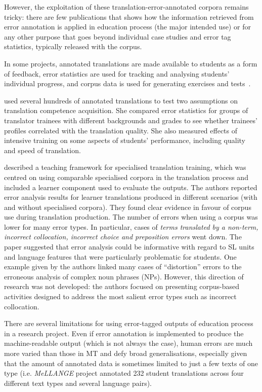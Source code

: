 However, the exploitation of these translation-error-annotated corpora remains tricky: there are few publications that shows how the information retrieved from error annotation is applied in education process (the major intended use) or for any other purpose that goes beyond individual case studies and error tag statistics, typically released with the corpus.

In some projects, annotated translations are made available to students as a form of feedback, error statistics are used for tracking and analysing students’ individual progress, and corpus data is used for generating exercises and tests~\cite{Kutuzov2014rltc,Fictumova2017}.

\citet{Wurm2020} used several hundreds of annotated translations to test two assumptions on translation competence acquisition. She compared error statistics for groups of translator trainees with different backgrounds and grades to see whether trainees' profiles correlated with the translation quality. She also measured effects of intensive training on some aspects of students' performance, including quality and speed of translation.

\citet{Kubler2018} described a teaching framework for specialised translation training, which was centred on using comparable specialised corpora in the translation process and included a learner component used to evaluate the outputs. The authors reported error analysis results for learner translations produced in different scenarios (with and without specialised corpora). They found clear evidence in favour of corpus use during translation production. The number of errors when using a corpus was lower for many error types. In particular, cases of \textit{terms translated by a non-term, incorrect collocation, incorrect choice and preposition errors} went down. The paper suggested that error analysis could be informative with regard to SL units and language features that were particularly problematic for students. One example given by the authors linked many cases of ``distortion'' errors to the erroneous analysis of complex noun phrases (NPs). However, this direction of research was not developed: the authors focused on presenting corpus-based activities designed to address the most salient error types such as incorrect collocation. 

There are several limitations for using error-tagged outputs of education process in a research project.
Even if error annotation is implemented to produce the machine-readable output (which is not always the case), human errors are much more varied than those in MT and defy broad generalisations, especially given that the amount of annotated data is sometimes limited to just a few texts of one type (i.e. \textit{MeLLANGE} project annotated 232 student translations across four different text types and several language pairs).

